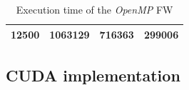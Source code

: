 \documentclass[compsoc]{IEEEtran}
\begin{document}
\begin{table}[h!]
\begin{tabular}{|r|r|r|r|}
12500                                                                                  & 1063129                                                                                      & 716363                                                                                       & 299006                                                                                       \\ \hline
\end{tabular}
\caption{Execution time of the \emph{OpenMP} FW}                                                                                                                                            
\label{tab:omp-time}
\end{table}

\subsection{CUDA implementation}



\end{document}
